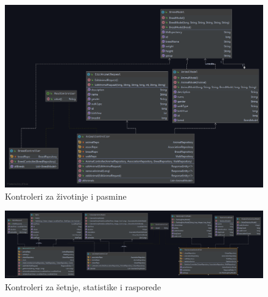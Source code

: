 			\eject
			
			\begin{figure}[H]
				\includegraphics[width=\linewidth]{slike/AnimalController-BreedController.png}
				\centering
				\caption{Kontroleri za životinje i pasmine}
				\label{fig:animalcontroler-breedcontroller}
			\end{figure}
			
			\begin{figure}[H]
				\includegraphics[width=\linewidth]{slike/WalkController-StatisticsController-CalendarController.png}
				\centering
				\caption{Kontroleri za šetnje, statistike i rasporede}
				\label{fig:walkcontroller-statisticscontroller-calendarcontroller}
			\end{figure}
			
			\eject
			
